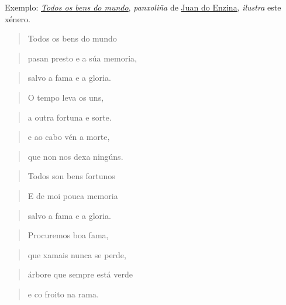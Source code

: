 \documentclass[
]{article}
\begin{document}
Exemplo:
\href{http://open.spotify.com/track/0l6KJwUYfv2GuKJ2HpOq1L}{\emph{Todos
os bens do mundo},} \emph{panxoliña} de
\href{http://es.wikipedia.org/wiki/Juan_del_Enzina}{Juan do Enzina,}
\emph{ilustra} este xénero.

\begin{quote}
Todos os bens do mundo
\end{quote}

\begin{quote}
pasan presto e a súa memoria,
\end{quote}

\begin{quote}
salvo a fama e a gloria.
\end{quote}

\begin{quote}
O tempo leva os uns,
\end{quote}

\begin{quote}
a outra fortuna e sorte.
\end{quote}

\begin{quote}
e ao cabo vén a morte,
\end{quote}

\begin{quote}
que non nos dexa ningúns.
\end{quote}

\begin{quote}
Todos son bens fortunos
\end{quote}

\begin{quote}
E de moi pouca memoria
\end{quote}

\begin{quote}
salvo a fama e a gloria.
\end{quote}

\begin{quote}
Procuremos boa fama,
\end{quote}

\begin{quote}
que xamais nunca se perde,
\end{quote}

\begin{quote}
árbore que sempre está verde
\end{quote}

\begin{quote}
e co froito na rama.
\end{quote}
\end{document}
